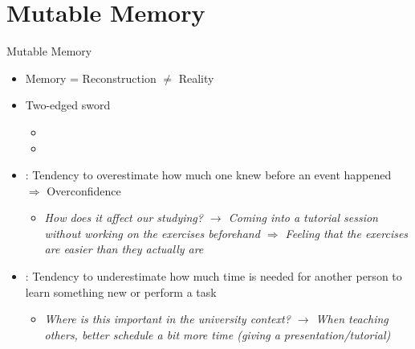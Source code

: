 \documentclass{ercisbeamer}
\begin{document}
\section{Mutable Memory}
\begin{frame}{Mutable Memory}
    \pause
    \begin{tbox}
        \begin{itemize}
            \item Memory = Reconstruction $\ne$ Reality
            \item Two-edged sword
            \begin{itemize}
                \item {} 
                \item {}
            \end{itemize}
            \item {}: Tendency to overestimate how much one knew before an event happened $\Rightarrow$ Overconfidence
            \begin{itemize}
                \item \emph{How does it affect our studying? \pause $\rightarrow$ Coming into a tutorial session without working on the exercises beforehand $\Rightarrow$ Feeling that the exercises are easier than they actually are}
            \end{itemize}
            \item {}: Tendency to underestimate how much time is needed for another person to learn something new or perform a task
            \begin{itemize}
                \item \emph{Where is this important in the university context? \pause $\rightarrow$ When teaching others, better schedule a bit more time (giving a presentation/tutorial)}
            \end{itemize}
        \end{itemize}     
    \end{tbox}
\end{frame}
\setbgimage{}
\end{document}
